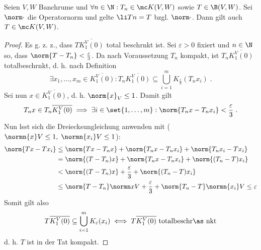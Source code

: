 \begin{theorem}
	Seien \(V,W\) Banchr\as ume und \(\forall n \in \N: T_n \in \mc K(V,W)\) sowie \(T\in \B(V,W)\). Sei \(\norm\cdot\) die Operatornorm und gelte \(\li Tn = T\) bzgl. \(\norm\cdot\). Dann gilt auch \(T\in \mc K(V,W)\).
	\label{limit_compact_op_is_compact}
\end{theorem}

\begin{proof}
	Es g. z. z., dass \(T\overline{K_1^V(0)}\) total beschr\as nkt ist. Sei \(\varepsilon > 0\) fixiert und \(n \in \N\) so, dass \(\norm{T-T_n}<\frac{\varepsilon}{3}\). Da nach Voraussetzung $T_n$ kompakt, ist \(T_n \overline{K_1^V(0)}\) totalbeschr\as nkt, d. h. nach Definition
	\[\exists x_1,\ldots,x_m \in \overline{K_1^V(0)}: T_n \overline{K_1^V(0)} \subseteq \bigcup_{i=1}^m K_{\frac\varepsilon3}(T_n x_i)\;.\]
	Sei nun \(x\in \overline{K_1^V(0)}\), d. h. \(\norm{x}_V \leq 1\). Damit gilt
	\[T_n x \in T_n\overline{K_1^V(0)} \implies \exists i\in \set{1,\ldots,m}: \norm{T_n x - T_n x_i} < \frac{\varepsilon}{3}\;.\]
	Nun l\as sst sich die Dreiecksungleichung anwenden mit (\(\normn{x}V \leq 1, \;\normn{x_i}V \leq 1\)):
	\begin{align*}
		\norm{Tx - Tx_i} &\leq \norm{Tx - T_n x} + \norm{T_n x - T_n x_i} + \norm{T_n x_i - T x_i}\\
		&  = \norm{(T-T_n)x }+ \norm{T_n x - T_n x_i}  + \norm{(T_n -T)x_i}\\
		& < \norm{(T-T_n)x }+ \frac\varepsilon 3 + \norm{(T_n -T)x_i}\\
		&\leq \norm{T-T_n}\normn xV + \frac\varepsilon 3 +\norm{T_n - T} \normn{x_i}V \leq \varepsilon
	\end{align*}
	Somit gilt also 
	\[T\overline{K_1^V(0)} \subseteq \bigcup_{i=1}^m K_\varepsilon (x_i) \iff T\overline{K_1^V(0)} \text{ totalbeschr\as nkt}\]
	d. h. $T$ ist in der Tat kompakt. 
\end{proof}